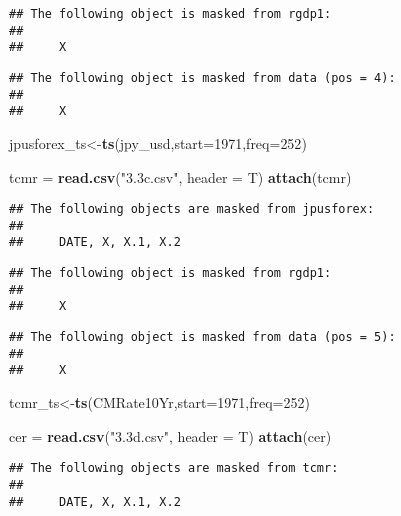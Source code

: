 \documentclass[]{article}
\newenvironment{Shaded}{\begin{snugshade}}{\end{snugshade}}
\newcommand{\KeywordTok}[1]{\textcolor[rgb]{0.13,0.29,0.53}{\textbf{#1}}}
\newcommand{\DataTypeTok}[1]{\textcolor[rgb]{0.13,0.29,0.53}{#1}}
\newcommand{\DecValTok}[1]{\textcolor[rgb]{0.00,0.00,0.81}{#1}}
\newcommand{\StringTok}[1]{\textcolor[rgb]{0.31,0.60,0.02}{#1}}
\newcommand{\NormalTok}[1]{#1}
\begin{document}
\begin{verbatim}
## The following object is masked from rgdp1:
## 
##     X
\end{verbatim}

\begin{verbatim}
## The following object is masked from data (pos = 4):
## 
##     X
\end{verbatim}

\begin{Shaded}
\begin{Highlighting}[]
\NormalTok{jpusforex_ts<-}\KeywordTok{ts}\NormalTok{(jpy_usd,}\DataTypeTok{start=}\DecValTok{1971}\NormalTok{,}\DataTypeTok{freq=}\DecValTok{252}\NormalTok{)}

\NormalTok{tcmr =}\StringTok{ }\KeywordTok{read.csv}\NormalTok{(}\StringTok{"3.3c.csv"}\NormalTok{, }\DataTypeTok{header =}\NormalTok{ T)}
\KeywordTok{attach}\NormalTok{(tcmr)}
\end{Highlighting}
\end{Shaded}

\begin{verbatim}
## The following objects are masked from jpusforex:
## 
##     DATE, X, X.1, X.2
\end{verbatim}

\begin{verbatim}
## The following object is masked from rgdp1:
## 
##     X
\end{verbatim}

\begin{verbatim}
## The following object is masked from data (pos = 5):
## 
##     X
\end{verbatim}

\begin{Shaded}
\begin{Highlighting}[]
\NormalTok{tcmr_ts<-}\KeywordTok{ts}\NormalTok{(CMRate10Yr,}\DataTypeTok{start=}\DecValTok{1971}\NormalTok{,}\DataTypeTok{freq=}\DecValTok{252}\NormalTok{)}

\NormalTok{cer =}\StringTok{ }\KeywordTok{read.csv}\NormalTok{(}\StringTok{"3.3d.csv"}\NormalTok{, }\DataTypeTok{header =}\NormalTok{ T)}
\KeywordTok{attach}\NormalTok{(cer)}
\end{Highlighting}
\end{Shaded}

\begin{verbatim}
## The following objects are masked from tcmr:
## 
##     DATE, X, X.1, X.2
\end{verbatim}
\end{document}
